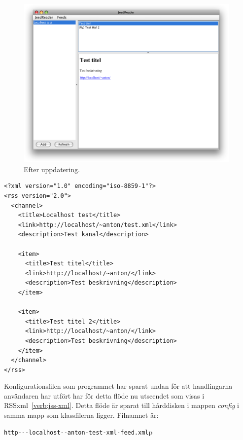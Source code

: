 \documentclass[titlepage, twoside, a4paper, 12pt]{article}
\begin{document}
\begin{figure}[H]
  \begin{center}
    \includegraphics[width=110mm]{images/update-test2-out.png}
    \caption{Efter uppdatering.}
    \label{fig:update-test2-out}
  \end{center}
\end{figure}

\begin{program}
\begin{footnotesize}
\begin{verbatim}
<?xml version="1.0" encoding="iso-8859-1"?>
<rss version="2.0">
  <channel>
    <title>Localhost test</title>
    <link>http://localhost/~anton/test.xml</link>
    <description>Test kanal</description>

    <item>
      <title>Test titel</title>
      <link>http://localhost/~anton/</link>
      <description>Test beskrivning</description>
    </item>

    <item>
      <title>Test titel 2</title>
      <link>http://localhost/~anton/</link>
      <description>Test beskrivning</description>
    </item>
  </channel>
</rss>
\end{verbatim}
\end{footnotesize}
\caption{Flöde efter uppdatering.}
\label{verb:2-test-xml}
\end{program}

Konfigurationsfilen som programmet har sparat undan för att
handlingarna användaren har utfört har för detta flöde nu utseendet
som visas i RSSxml~\ref{verb:jss-xml}. Detta flöde är sparat till
hårddisken i mappen \textit{config} i samma mapp som klassfilerna
ligger. Filnamnet är:

\verb!http---localhost--anton-test-xml-feed.xml!p
\end{document}

